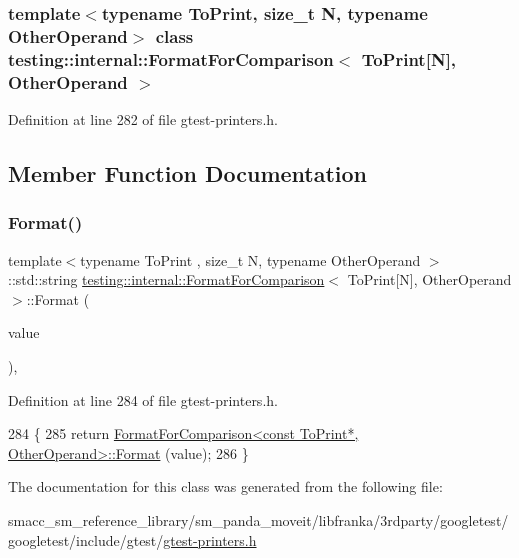 \subsubsection*{template$<$typename To\+Print, size\+\_\+t N, typename Other\+Operand$>$\newline
class testing\+::internal\+::\+Format\+For\+Comparison$<$ To\+Print\mbox{[}\+N\mbox{]}, Other\+Operand $>$}



Definition at line 282 of file gtest-\/printers.\+h.



\subsection{Member Function Documentation}
\mbox{\label{classtesting_1_1internal_1_1FormatForComparison_3_01ToPrint[N]_00_01OtherOperand_01_4_a76c526461c8fa7df75f7b32ab889b9e0}} 
\subsubsection{\texorpdfstring{Format()}{Format()}}
{\footnotesize\ttfamily template$<$typename To\+Print , size\+\_\+t N, typename Other\+Operand $>$ \\
\+::std\+::string \hyperlink{classtesting_1_1internal_1_1FormatForComparison}{testing\+::internal\+::\+Format\+For\+Comparison}$<$ To\+Print\mbox{[}N\mbox{]}, Other\+Operand $>$\+::Format (\begin{DoxyParamCaption}\item[{const To\+Print $\ast$}]{value }\end{DoxyParamCaption})\hspace{0.3cm}{\ttfamily [inline]}, {\ttfamily [static]}}



Definition at line 284 of file gtest-\/printers.\+h.


\begin{DoxyCode}
284                                                 \{
285     \textcolor{keywordflow}{return} \hyperlink{classtesting_1_1internal_1_1FormatForComparison_a2aeb688fc55b57abd3021d82eccad896}{FormatForComparison<const ToPrint*, OtherOperand>::Format}
      (value);
286   \}
\end{DoxyCode}


The documentation for this class was generated from the following file\+:\begin{DoxyCompactItemize}
\item 
smacc\+\_\+sm\+\_\+reference\+\_\+library/sm\+\_\+panda\+\_\+moveit/libfranka/3rdparty/googletest/googletest/include/gtest/\hyperlink{gtest-printers_8h}{gtest-\/printers.\+h}\end{DoxyCompactItemize}

